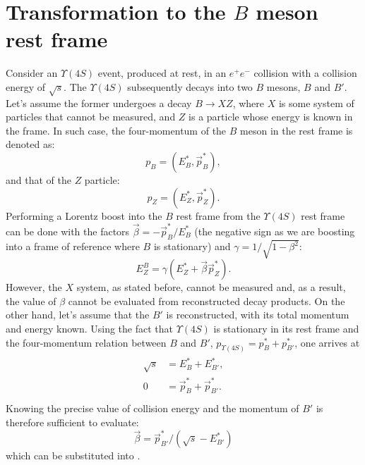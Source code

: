 \chapter{Transformation to the \texorpdfstring{$B$}{B} meson rest frame} \label{sec:appendix_boosting_to_b_frame}

Consider an $\Upsilon(4S)$ event, produced at rest, in an $e^+e^-$ collision with a collision energy of $\sqrt{s}$.
The $\Upsilon(4S)$ subsequently decays into two $B$ mesons, $B$ and $B'$.
Let's assume the former undergoes a decay $B\to X Z$, where $X$ is some system of particles that cannot be measured, and $Z$ is a particle whose energy is known in the \FourS frame.
In such case, the four-momentum of the $B$ meson in the \FourS rest frame is denoted as:
\begin{equation}
	p_{B} = (E_B^*,\vec{p}_{B}^*),
\end{equation}
and that of the $Z$ particle:
\begin{equation}
	p_{Z} = (E_{Z}^*,\vec{p}_{Z}^*).
\end{equation}
Performing a Lorentz boost into the $B$ rest frame from the $\Upsilon(4S)$ rest frame can be done
with the factors $\vec{\beta}=-\vec{p}_{B}^*/E_{B}^*$ (the negative sign as we are boosting into a frame of reference where $B$ is stationary)
and $\gamma = 1/\sqrt{1-\beta^2}$:
\begin{equation}\label{eq:egamma}
	E_{Z}^B = \gamma(E_{Z}^* + \vec{\beta}\vec{p}_{Z}^*). 
\end{equation}
However, the $X$ system, as stated before, cannot be measured and, as a result, the value of $\beta$ cannot be evaluated from reconstructed decay products.
On the other hand, let's assume that the $B'$ is reconstructed, with its total momentum and energy known.
Using the fact that $\Upsilon(4S)$ is stationary in its rest frame and the four-momentum relation between $B$ and $B'$,
$p_{\Upsilon(4S)}=p_B^*+p^*_{B'}$, one arrives at
\begin{align}
	\begin{split}
		\sqrt{s} &= E^*_{B}+E^*_{B'},\\
		0 &= \vec{p}_B^* + \vec{p}^*_{B'}.\\
	\end{split}
\end{align}
Knowing the precise value of collision energy and the momentum of $B'$ is therefore sufficient to evaluate:
\begin{equation}
	\vec{\beta}= \vec{p}^*_{B'}/(\sqrt{s}-E^*_{B'})
\end{equation}
which can be substituted into .

